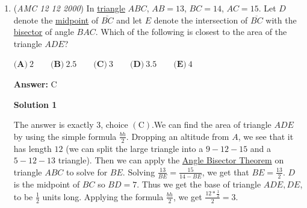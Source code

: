 \begin{enumerate}
 \textbf{Answer: }A



\textbf{Solution 1}

There are either 
 \[65 + 200 = 265\] or 
 \[66 + 200 = 266\] days between the first two dates depending upon whether or not year $N+1$ is a leap year (since the February 29th of the leap year would come between the 300th day of year $N$ and 200th day of year $N + 1$). Since $7$ divides into $266$ but not $265$, for both days to be a Tuesday, year $N$ must be a leap year.

 Hence, year $N-1$ is not a leap year, and so since there are 
 \[265 + 300 = 565\] days between the date in years $N,\text{ }N-1$, this leaves a remainder of $5$ upon division by $7$. Since we are subtracting days, we count 5 days before Tuesday, which gives us  $\boxed{\mathbf{(A)} \ \text{Thursday}.}$




\textbf{Solution 2}

The $300-29\cdot 7=97^{\text{th}}$ day of year $N$ and the $200-15\cdot 7=95^{\text{th}}$ day of year $N+1$ are Tuesdays. If there were the same number of days in year $N$ and year $N-1,$ the $99^{\text{th}}$ day of year $N-1$ will be a Tuesday. But year $N$ is a leap year because $97-95 \cong 366 \pmod{7},$ so the $98^{\text{th}}$ day of year $N-1$ is a Tuesday. It follows that the $100^{\text{th}}$ day of year $N-1$ is $\boxed{\mathbf{(A)} \ \text{Thursday}.}$



	\item (\textit{AMC 12 12 2000}) In \href{https://artofproblemsolving.com/wiki/index.php?title=Triangle}{triangle} $ABC$, $AB = 13$, $BC = 14$, $AC = 15$. Let $D$ denote the \href{https://artofproblemsolving.com/wiki/index.php?title=Midpoint}{midpoint} of $\overline{BC}$ and let $E$ denote the intersection of $\overline{BC}$ with the \href{https://artofproblemsolving.com/wiki/index.php?title=Angle\_bisector}{bisector} of angle $BAC$. Which of the following is closest to the area of the triangle $ADE$?


 $\textbf {(A)}\ 2 \qquad \textbf {(B)}\ 2.5 \qquad \textbf {(C)}\ 3 \qquad \textbf {(D)}\ 3.5 \qquad \textbf {(E)}\ 4$

 \textbf{Answer: }C



\textbf{Solution 1}

The answer is exactly $3$, choice $\mathrm{(C)}$.We can find the area of triangle $ADE$ by using the simple formula $\frac{bh}{2}$. Dropping an altitude from $A$, we see that it has length $12$ (we can split the large triangle into a $9-12-15$ and a $5-12-13$ triangle). Then we can apply the \href{https://artofproblemsolving.com/wiki/index.php?title=Angle\_Bisector\_Theorem}{Angle Bisector Theorem} on triangle $ABC$ to solve for $BE$. Solving $\frac{13}{BE}=\frac{15}{14-BE}$, we get that $BE=\frac{13}{2}$. $D$ is the midpoint of $BC$ so $BD=7$. Thus we get the base of triangle $ADE, DE$, to be $\frac{1}{2}$ units long. Applying the formula $\frac{bh}{2}$, we get $\frac{12*\frac{1}{2}}{2}=3$.


\end{enumerate}

